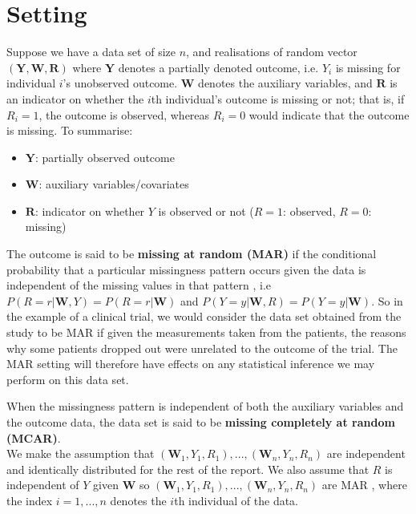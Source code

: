 \documentclass[12pt,twoside]{article}
\begin{document}
\clearpage 
\section{Setting} 

Suppose we have a data set of size $n$, and realisations of random vector $(\mathbf{Y}, \mathbf{W}, \mathbf{R})$ where $\mathbf{Y}$ denotes a partially denoted outcome, i.e. $Y_i$ is missing for individual $i$'s unobserved outcome. $\mathbf{W}$ denotes the auxiliary variables, and $\mathbf{R}$ is an indicator on whether the $i$th individual's outcome is missing or not; that is, if $R_i = 1$, the outcome is observed, whereas $R_i = 0$ would indicate that the outcome is missing.
To summarise:
\begin{itemize}
    \item $\mathbf{Y}$: partially observed outcome 
    \item $\mathbf{W}$: auxiliary variables/covariates 
    \item $\mathbf{R}$: indicator on whether $Y$ is observed or not ($R = 1$: observed, $R = 0$: missing) 
\end{itemize}

The outcome is said to be \textbf{missing at random (MAR)} if the conditional probability that a particular missingness pattern occurs given the data is independent of the missing values in that pattern \citep{vansteelandt}, i.e $P(R=r|\mathbf{W}, Y) = P(R= r|\mathbf{W})$ and  $P(Y=y|\mathbf{W}, R) = P(Y=y|\mathbf{W})$. So in the example of a clinical trial, we would consider the data set obtained from the study to be MAR if given the measurements taken from the patients, the reasons why some patients dropped out were unrelated to the outcome of the trial. The MAR setting will therefore have effects on any statistical inference we may perform on this data set.

When the missingness pattern is independent of both the auxiliary variables and the outcome data, the data set is said to be \textbf{missing completely at random (MCAR)}.\\

We make the assumption that $(\mathbf{W}_1, Y_1, R_1),...,(\mathbf{W}_n, Y_n, R_n)$ are independent and identically distributed for the rest of the report. We also assume that $R$ is independent of $Y$ given $\mathbf{W}$ so $(\mathbf{W}_1, Y_1, R_1), ... ,(\mathbf{W}_n, Y_n, R_n)$ are MAR \citep{vansteelandt}, where the index $i = 1,...,n$ denotes the $i$th individual of the data.\\
\end{document}
